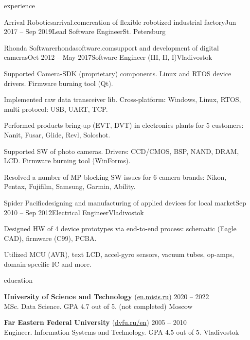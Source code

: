 \documentclass{Vladimir.Ivanov.CV}
\begin{document}
\begin{rSection}{experience}
\begin{rCompany}{Arrival Robotics}{arrival.com}{creation of flexible robotized industrial factory}{Jun 2017 -- Sep 2019}{Lead Software Engineer}{St. Petersburg}
\end{rCompany}
\begin{rCompany}{Rhonda Software}{rhondasoftware.com}{support and development of digital cameras}{Oct 2012 -- May 2017}{Software Engineer (III, II, I)}{Vladivostok}

\item Supported Camera-SDK (proprietary) components. Linux and RTOS device drivers. Firmware burning tool (Qt).
\item Implemented raw data transceiver lib. Cross-platform: Windows, Linux, RTOS, multi-protocol: USB, UART, TCP.
\item Performed products bring-up (EVT, DVT) in electronics plants for 5 customers: Nanit, Fusar, Glide, Revl, Soloshot.
\item Supported SW of photo cameras. Drivers: CCD/CMOS, BSP, NAND, DRAM, LCD. Firmware burning tool (WinForms).
\item Resolved a number of MP-blocking SW issues for 6 camera brands: Nikon, Pentax, Fujifilm, Samsung, Garmin, Ability.

\end{rCompany}
\begin{rCompany}{Spider Pacific}{}{designing and manufacturing of applied devices for local market}{Sep 2010 -- Sep 2012}{Electrical Engineer}{Vladivostok}

\item Designed HW of 4 device prototypes via end-to-end process: schematic (Eagle CAD), firmware (C99), PCBA.
\item Utilized MCU (AVR), text LCD, accel-gyro sensors, vacuum tubes, op-amps, domain-specific IC and more.

\end{rCompany}
\end{rSection}

\begin{rSection}{education}

{\bf University of Science and Technology } {(\href{https://en.misis.ru}{en.misis.ru})} \hfill {2020 -- 2022} \\
MSc. Data Science. GPA 4.7 out of 5. (not completed) \hfill {Moscow}

{\bf Far Eastern Federal University} {(\href{https://www.dvfu.ru/en}{dvfu.ru/en})} \hfill {2005 -- 2010} \\
Engineer. Information Systems and Technology. GPA 4.5 out of 5. \hfill {Vladivostok}

\end{rSection}
\end{document}
